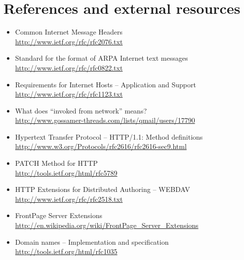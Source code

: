\section{References and external resources}

\begin{itemize}
	\item Common Internet Message Headers\\\url{http://www.ietf.org/rfc/rfc2076.txt}
	\item Standard for the format of ARPA Internet text messages\\\url{http://www.ietf.org/rfc/rfc0822.txt}
	\item Requirements for Internet Hosts -- Application and Support\\\url{http://www.ietf.org/rfc/rfc1123.txt}
	\item What does ``invoked from network'' means?\\\url{http://www.gossamer-threads.com/lists/qmail/users/17790}
	\item Hypertext Transfer Protocol -- HTTP/1.1: Method definitions\\\url{http://www.w3.org/Protocols/rfc2616/rfc2616-sec9.html}
	\item PATCH Method for HTTP\\\url{http://tools.ietf.org/html/rfc5789}
	\item HTTP Extensions for Distributed Authoring -- WEBDAV\\\url{http://www.ietf.org/rfc/rfc2518.txt}
	\item FrontPage Server Extensions\\\url{http://en.wikipedia.org/wiki/FrontPage_Server_Extensions}
	\item Domain names -- Implementation and specification\\\url{http://tools.ietf.org/html/rfc1035}
\end{itemize}

